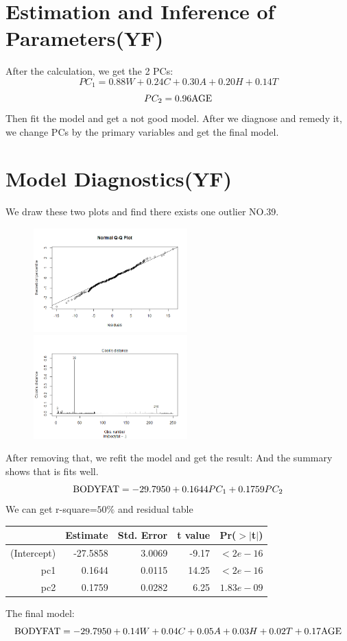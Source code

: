 \documentclass[12pt]{article}
\begin{document}
\section{\sffamily Estimation and Inference of Parameters(YF)}
After the calculation, we get the 2 PCs:
$$PC_1 = 0.88W + 0.24 C + 0.30
A + 0.20  H + 0.14 T$$
$$PC_2 = 0.96{\rm AGE} $$
Then fit the model and get a not good model. 
After we diagnose and remedy it, we change PCs by the primary variables and get the final model.
\section{\sffamily Model Diagnostics(YF)}
We draw these two plots and find there exists one outlier NO.39.
\begin{figure}[ht]
	\centering
	\includegraphics[width=6cm,height=4cm]{2.png}
	\includegraphics[width=6cm,height=4cm]{3.png}  
\end{figure}
After removing that, we refit the model and get the result:
And the summary shows that is fits well.
$${\rm BODYFAT} = -29.7950 + 0.1644PC_1 + 0.1759PC_2$$
We can get r-square=$50\%$ and residual table
\begin{table}[ht]
    \centering
    \begin{tabular}{rrrrr}
      \hline
     & Estimate & Std. Error & t value & Pr($>$$|$t$|$) \\ 
      \hline
    (Intercept) & -27.5858 & 3.0069 & -9.17 & $<2e-16$ \\ 
      pc1 & 0.1644 & 0.0115 & 14.25 & $<2e-16$  \\ 
      pc2 & 0.1759 & 0.0282 & 6.25 & $1.83e-09$ \\ 
       \hline
    \end{tabular}
    \end{table}
The final model: $${\rm BODYFAT} = -29.7950 + 0.14W + 0.04C + 0.05A+ 0.03H +0.02T + 0.17{\rm AGE}$$
\end{document}
